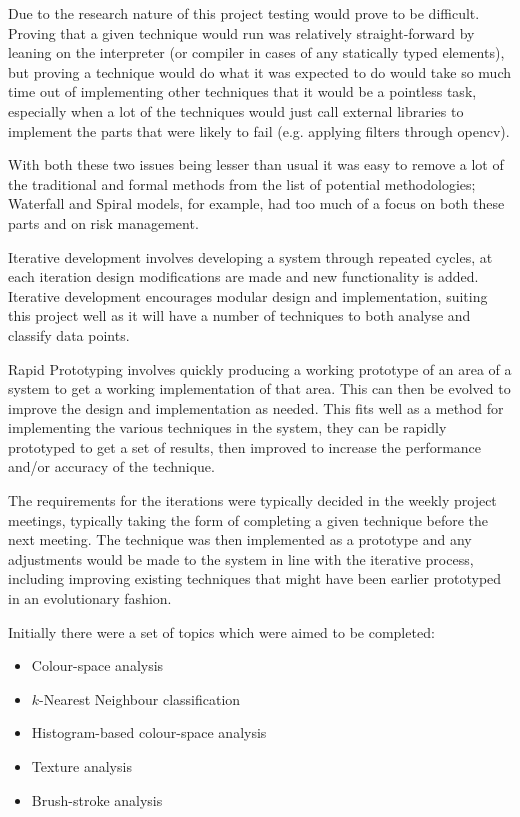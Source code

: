 Due to the research nature of this project testing would prove to be difficult. Proving that a
given technique would run was relatively straight-forward by leaning on the interpreter (or 
compiler in cases of any statically typed elements), but proving a technique would do what it was
expected to do would take so much time out of implementing other techniques that it would be a 
pointless task, especially when a lot of the techniques would just call external libraries to
implement the parts that were likely to fail (e.g. applying filters through \gls{opencv}).

With both these two issues being lesser than usual it was easy to remove a lot of the traditional
and formal methods from the list of potential methodologies; Waterfall and Spiral models, for 
example, had too much of a focus on both these parts and on risk management.

Iterative development involves developing a system through repeated cycles, at each iteration 
design modifications are made and new functionality is added. Iterative development encourages 
modular design and implementation, suiting this project well as it will have a number of 
techniques to both analyse and classify data points.

Rapid Prototyping involves quickly producing a working prototype of an area of a system to get a
working implementation of that area. This can then be evolved to improve the design and 
implementation as needed. This fits well as a method for implementing the various techniques in 
the system, they can be rapidly prototyped to get a set of results, then improved to increase the
performance and/or accuracy of the technique.

The requirements for the iterations were typically decided in the weekly project meetings, typically 
taking the form of completing a given technique before the next meeting. The technique
was then implemented as a prototype and any adjustments would be made to the system in line with
the iterative process, including improving existing techniques that might have been earlier 
prototyped in an evolutionary fashion.

Initially there were a set of topics which were aimed to be completed:

\begin{itemize}
\item Colour-space analysis
\item $k$-Nearest Neighbour classification
\item Histogram-based colour-space analysis
\item Texture analysis
\item Brush-stroke analysis
\end{itemize}


